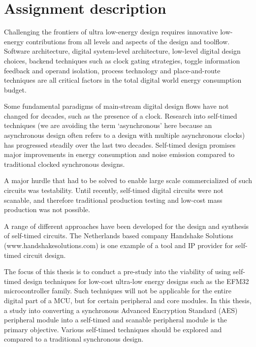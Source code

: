 \section*{Assignment description}

Challenging the frontiers of ultra low-energy design requires
innovative low-energy contributions from all levels and aspects of the
design and toolflow. Software architecture, digital system-level
architecture, low-level digital design choices, backend techniques
such as clock gating strategies, toggle information feedback and
operand isolation, process technology and place-and-route techniques
are all critical factors in the total digital world energy consumption
budget.

Some fundamental paradigms of main-stream digital design flows have
not changed for decades, such as the presence of a clock. Research
into self-timed techniques (we are avoiding the term ‘asynchronous’
here because an asynchronous design often refers to a design with
multiple asynchronous clocks) has progressed steadily over the last
two decades. Self-timed design promises major improvements in energy
consumption and noise emission compared to traditional clocked
synchronous designs.

A major hurdle that had to be solved to enable large scale
commercialized of such circuits was testability. Until recently,
self-timed digital circuits were not scanable, and therefore
traditional production testing and low-cost mass production was not
possible.

A range of different approaches have been developed for the design and
synthesis of self-timed circuits. The Netherlands based company
Handshake Solutions (www.handshakesolutions.com) is one example of a
tool and IP provider for self-timed circuit design.

The focus of this thesis is to conduct a pre-study into the viability
of using self-timed design techniques for low-cost ultra-low energy
designs such as the EFM32 microcontroller family. Such techniques will
not be applicable for the entire digital part of a MCU, but for
certain peripheral and core modules. In this thesis, a study into
converting a synchronous Advanced Encryption Standard (AES) peripheral
module into a self-timed and scanable peripheral module is the primary
objective. Various self-timed techniques should be explored and
compared to a traditional synchronous design.
